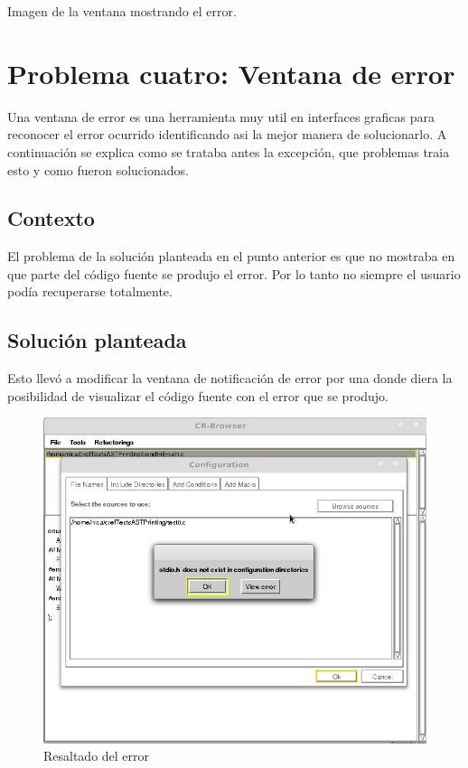 \documentclass[a4paper,oneside,10pt]{article}
\begin{document}
Imagen de la ventana mostrando el error.

\section{Problema cuatro: Ventana de error}

Una ventana de error es una herramienta muy util en interfaces graficas para reconocer el error ocurrido identificando asi la mejor manera de solucionarlo.
A continuaci\'on se explica como se trataba antes la excepci\'on, que problemas traia esto y como fueron solucionados.

\subsection{Contexto}
El problema de la soluci\'on planteada en el punto anterior es que no mostraba en que parte del c\'odigo fuente se produjo el error. Por lo tanto no siempre el usuario pod\'ia recuperarse totalmente.

\subsection{Soluci\'on planteada}
Esto llev\'o a modificar la ventana de notificaci\'on de error por una donde diera la posibilidad de visualizar el c\'odigo fuente con el error que se produjo. 

\begin{figure}[h!]
  \centering
    \includegraphics[scale=0.50]{images/codigo_modificado/error_header_no_encontrado.jpg}
     \caption{Resaltado del error}
\end{figure}
\end{document}
